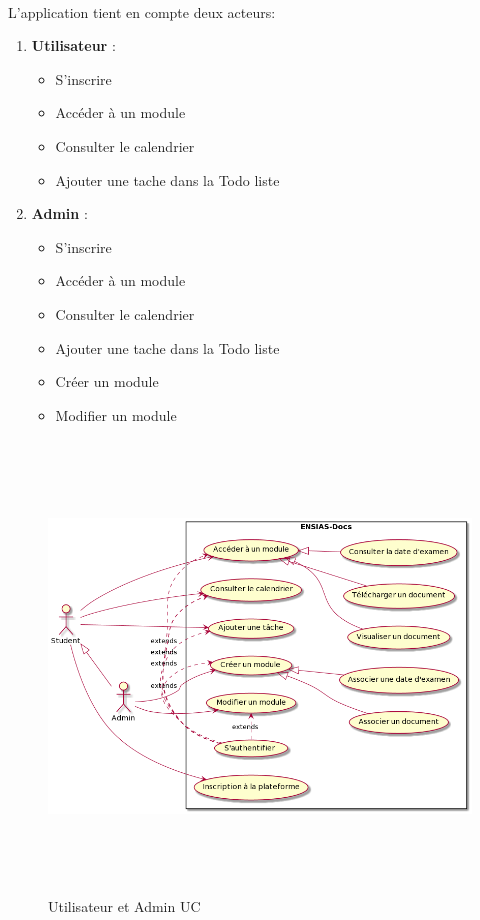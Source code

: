 \documentclass{article}
\begin{document}
{\onehalfspacing\paragraph{}{L'application tient en compte deux acteurs:}

\vspace{0.5cm}
\begin{enumerate}
    \item\textbf{ Utilisateur} :
        \begin{itemize}[label=\textbullet]
        \item S'inscrire
        \item Accéder à un module
        \item Consulter le calendrier
        \item Ajouter une tache dans la Todo liste
        \end{itemize}
    \vspace{0.5cm}
    \item\textbf{ Admin} :
        \begin{itemize}[label=\textbullet]
        \item S'inscrire
        \item Accéder à un module
        \item Consulter le calendrier
        \item Ajouter une tache dans la Todo liste
        \item Créer un module
        \item Modifier un module
        \end{itemize}
\end{enumerate}
\vspace{1.3cm}
\begin{figure}[H]
    \includegraphics[width=16cm,height=12cm]{JEEUseCase.png}
    \caption{Utilisateur et Admin UC}
    \label{fig:Utilisateur et admin UC.}
\end{figure}


}
\end{document}
